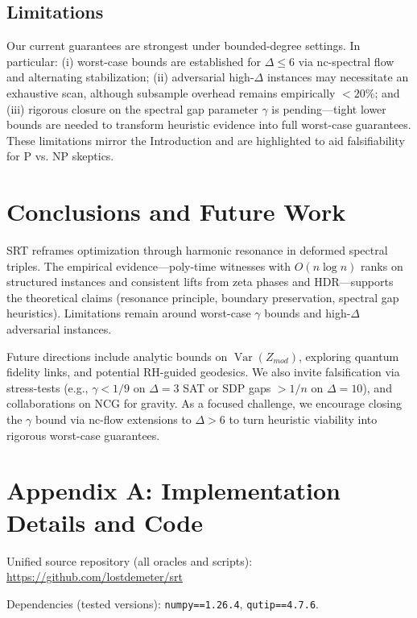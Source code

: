 \documentclass{article}
\DeclareMathOperator{\Var}{Var}
\begin{document}
\subsection{Limitations}

Our current guarantees are strongest under bounded-degree settings. In particular: (i) worst-case bounds are established for $\Delta \leq 6$ via nc-spectral flow and alternating stabilization; (ii) adversarial high-$\Delta$ instances may necessitate an exhaustive scan, although subsample overhead remains empirically $<20\%$; and (iii) rigorous closure on the spectral gap parameter $\gamma$ is pending---tight lower bounds are needed to transform heuristic evidence into full worst-case guarantees. These limitations mirror the Introduction and are highlighted to aid falsifiability for P vs. NP skeptics.


\section{Conclusions and Future Work}

SRT reframes optimization through harmonic resonance in deformed spectral triples. The empirical evidence---poly-time witnesses with $O(n\log n)$ ranks on structured instances and consistent lifts from zeta phases and HDR---supports the theoretical claims (resonance principle, boundary preservation, spectral gap heuristics). Limitations remain around worst-case $\gamma$ bounds and high-$\Delta$ adversarial instances.

Future directions include analytic bounds on $\Var(Z_{mod})$, exploring quantum fidelity links, and potential RH-guided geodesics. We also invite falsification via stress-tests (e.g., $\gamma<1/9$ on $\Delta=3$ SAT or SDP gaps $>1/n$ on $\Delta=10$), and collaborations on NCG for gravity.
As a focused challenge, we encourage closing the $\gamma$ bound via nc-flow extensions to $\Delta>6$ to turn heuristic viability into rigorous worst-case guarantees.

\appendix
\section*{Appendix A: Implementation Details and Code}

Unified source repository (all oracles and scripts): \url{https://github.com/lostdemeter/srt}

Dependencies (tested versions): \texttt{numpy==1.26.4}, \texttt{qutip==4.7.6}.
\end{document}
